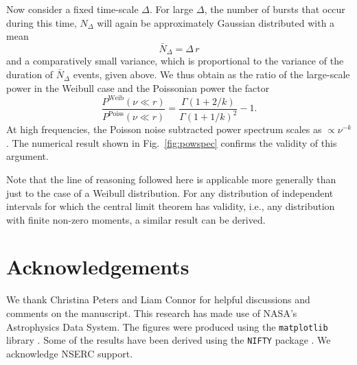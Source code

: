 \documentclass[fleqn,usenatbib]{mnras}
\newcommand{\new}[1]{#1}
\begin{document}
\new{Now consider a fixed time-scale $\Delta$. For large $\Delta$, the number of bursts that occur during this time, $N_\Delta$ will again be approximately Gaussian distributed with a mean
\begin{equation}
	\bar{N}_\Delta = \Delta \, r
\end{equation}
and a comparatively small variance, which is proportional to the variance of the duration of $\bar{N}_\Delta$ events, given above. We thus obtain as the ratio of the large-scale power in the Weibull case and the Poissonian power the factor
\begin{equation}
	\frac{P^{\mathrm{Weib}}(\nu \ll r)}{P^{\mathrm{Poiss}}(\nu \ll r)} = \frac{\Gamma\left(1 + 2/k\right)}{\Gamma\left(1 + 1/k\right)^2} - 1.
\end{equation}
At high frequencies, the Poisson noise subtracted power spectrum scales as $\propto \nu^{-k}$.
The numerical result shown in Fig.~\ref{fig:powspec} confirms the validity of this argument.}

\new{Note that the line of reasoning followed here is applicable more generally than just to the case of a Weibull distribution. For any distribution of independent intervals for which the central limit theorem has validity, i.e., any distribution with finite non-zero moments, a similar result can be derived.}


\section*{Acknowledgements}

We thank \new{Christina Peters and Liam Connor for helpful discussions and comments on the manuscript}. This research has made use of NASA's Astrophysics Data System. The figures were produced using the \texttt{matplotlib} library \citep{hunter-2007}. \new{Some of the results have been derived using the \texttt{NIFTY} package \citep{selig-2013}.} We acknowledge NSERC support.







\bsp
\label{lastpage}
\end{document}
